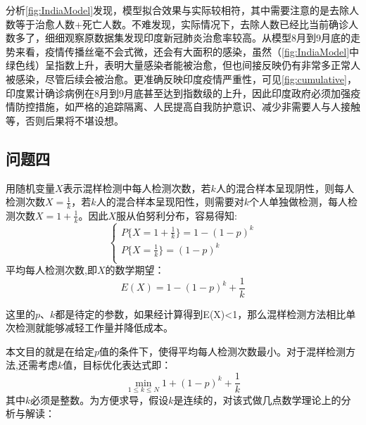 \documentclass[withoutpre]{cumcmthesis} %
\begin{document}
分析\cref{fig:IndiaModel}发现，模型拟合效果与实际较相符，其中需要注意的是去除人数等于治愈人数+死亡人数。不难发现，实际情况下，去除人数已经比当前确诊人数多了，细细观察原数据集发现印度新冠肺炎治愈率较高。从模型8月到9月底的走势来看，疫情传播丝毫不会式微，还会有大面积的感染，虽然（\cref{fig:IndiaModel}中绿色线）呈指数上升，表明大量感染者能被治愈，但也间接反映仍有非常多正常人被感染，尽管后续会被治愈。更准确反映印度疫情严重性，可见\cref{fig:cumulative}，印度累计确诊病例在8月到9月底甚至达到指数级的上升，因此印度政府必须加强疫情防控措施，如严格的追踪隔离、人民提高自我防护意识、减少非需要人与人接触等，否则后果将不堪设想。


\subsection{问题四}

用随机变量$X$表示混样检测中每人检测次数，若$k$人的混合样本呈现阴性，则每人检测次数$X = \frac{1}{k}$，若$k$人的混合样本呈现阳性，则需要对$k$个人单独做检测，每人检测次数$X = 1 + \frac{1}{k}$。因此$X$服从伯努利分布，容易得知:
\begin{equation}
    \left\{\begin{array}{l}
        P\{X=1+\frac{1}{k}\}=1-(1-p)^k \\
        P\{X=\frac{1}{k}\}=(1-p)^k \\
        \end{array}\right.
    \label{equation:1}
\end{equation}
平均每人检测次数,即$X$的数学期望：
\begin{equation}
E(X)=1-(1-p)^k+\frac{1}{k}
\end{equation}

这里的$p$、$k$都是待定的参数，如果经计算得到E(X)<1，那么混样检测方法相比单次检测就能够减轻工作量并降低成本。

本文目的就是在给定$p$值的条件下，使得平均每人检测次数最小。对于混样检测方法,还需考虑$k$值，目标优化表达式即：
\begin{equation}
    \min_{1\leqslant k\leqslant N}  1+(1-p)^k+\frac{1}{k}
    \label{euqation:target}
\end{equation}
其中$k$必须是整数。为方便求导，假设$k$是连续的，对该式做几点数学理论上的分析与解读：\\
\end{document}
